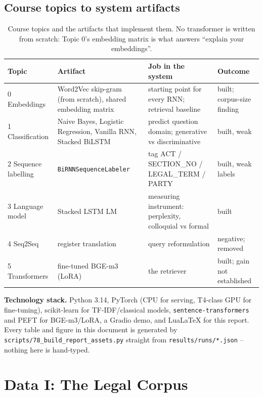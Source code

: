 \documentclass[10pt,a4paper]{article}
\begin{document}
\subsection{Course topics to system artifacts}
\begin{table}[H]
\centering\small
\begin{tabular}{@{}lp{4.3cm}p{5.0cm}p{2.6cm}@{}}
\toprule
\textbf{Topic} & \textbf{Artifact} & \textbf{Job in the system} & \textbf{Outcome}\\
\midrule
0 Embeddings & Word2Vec skip-gram (from scratch), shared embedding matrix & starting point for every RNN; retrieval baseline & built; corpus-size finding\\
1 Classification & Naive Bayes, Logistic Regression, Vanilla RNN, Stacked BiLSTM & predict question domain; generative vs discriminative & built, weak\\
2 Sequence labelling & \texttt{BiRNNSequenceLabeler} & tag ACT / SECTION\_NO / LEGAL\_TERM / PARTY & built, weak labels\\
3 Language model & Stacked LSTM LM & measuring instrument: perplexity, colloquial vs formal & built\\
4 Seq2Seq & register translation & query reformulation & negative; removed\\
5 Transformers & fine-tuned BGE-m3 (LoRA) & the retriever & built; gain not established\\
\bottomrule
\end{tabular}
\caption{Course topics and the artifacts that implement them. No transformer is written from scratch: Topic 0's embedding matrix is what answers ``explain your embeddings''.}
\end{table}

\textbf{Technology stack.} Python 3.14, PyTorch (CPU for serving, T4-class GPU for fine-tuning), scikit-learn for TF-IDF/classical models, \texttt{sentence-transformers} and PEFT for BGE-m3/LoRA, a Gradio demo, and LuaLaTeX for this report. Every table and figure in this document is generated by \texttt{scripts/78\_build\_report\_assets.py} straight from \texttt{results/runs/*.json} -- nothing here is hand-typed.

\section{Data I: The Legal Corpus}
\end{document}

